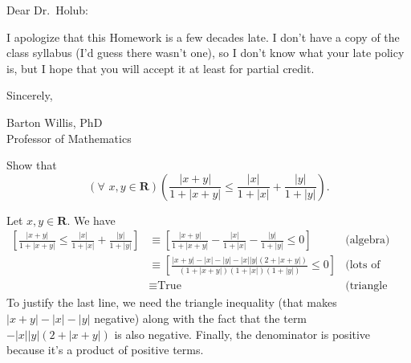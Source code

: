 \documentclass[fleqn, 12pt,answers]{exam}
\newcommand{\reals}{\mathbf{R}}
\newcommand\PM{{\sc pm}}
\newcommand{\quiz}{1}
\newcommand{\term}{Fall}
\newcommand{\due}{Saturday 27 August  at 11:59 \PM}
\begin{document}






\noindent Dear Dr.\ Holub:

\noindent I apologize that this Homework is a few decades late. I don't have a 
copy of the class syllabus (I'd guess there wasn't one), so I don't
know what your late policy is, but I hope that you will accept it
at least for partial credit.

\vspace{0.5in}
\noindent Sincerely,

\noindent Barton Willis, PhD \\
\noindent Professor of Mathematics


\vspace{1.0in}
\begin{quote}
  \end{quote}
\vspace{0.1in}
\begin{questions} 

\question Show that 
\[
   \left(\forall \,\, x, y \in \reals \right) 
    \left(\frac{|x+y|}{1 + |x+y|} \leq 
    \frac{|x|}{1 + |x|} + \frac{|y|}{1 + |y|} \right).
\]

\begin{solution}
Let $x,y \in \reals$. We have
\begin{align*}
    \left[\frac{|x+y|}{1 + |x+y|} \leq 
    \frac{|x|}{1 + |x|} + \frac{|y|}{1 + |y|} \right] &\equiv
    \left[\frac{|x+y|}{1 + |x+y|} - \frac{|x|}{1 + |x|} - \frac{|y|}{1 + |y|} \leq 0 \right] 
      &\mbox{(algebra)} \\
      &\equiv \left[ \frac{|x+y| - |x| - |y| - |x| |y| (2 + |x+y|)}{(1 + |x+y|) (1 + |x|) 
      (1 + |y|) } \leq 0  \right] &\mbox{(lots of algebra)} \\
      &\equiv \mbox{True} &\mbox{(triangle inequality)}
\end{align*}
To justify the last line, we need the triangle inequality (that makes 
$|x+y| - |x| - |y|$ negative) along with the fact that the term
$- |x| |y| (2 + |x+y|)$ is also negative. Finally, 
the denominator is positive because it's a product of
positive terms.
\end{solution}

\end{questions}
\end{document}
